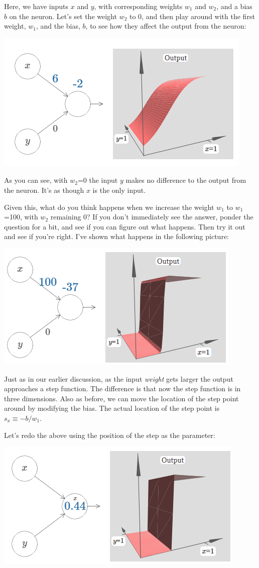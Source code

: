 Here, we have inputs $x$ and $y$, with corresponding weights $w_1$ and $w_2$, and a bias $b$ on the neuron. Let's set the weight $w_2$ to 0, and then play around with the first weight, $w_1$, and the bias, $b$, to see how they affect the output from the neuron:


{\centering \includegraphics[width=.6\textwidth,]{pic/wigglyfn22} \par}


As you can see, with $w_2$=0 the input $y$ makes no difference to the output from the neuron. It's as though $x$ is the only input.

Given this, what do you think happens when we increase the weight $w_1$
to $w_1$=100, with $w_2$ remaining 0? If you don't immediately see the answer, ponder the question for a bit, and see if you can figure out what happens. Then try it out and see if you're right. I've shown what happens in the following picture:

{\centering \includegraphics[width=.6\textwidth,]{pic/wigglyfn23} \par}

Just as in our earlier discussion, as the input \textit{weight} gets larger the output approaches a step function. The difference is that now the step function is in three dimensions. Also as before, we can move the location of the step point around by modifying the bias. The actual location of the step point is $s_x \equiv -b/w_1$.

Let's redo the above using the position of the step as the parameter:

{\centering \includegraphics[width=.6\textwidth,]{pic/wigglyfn24} \par}

